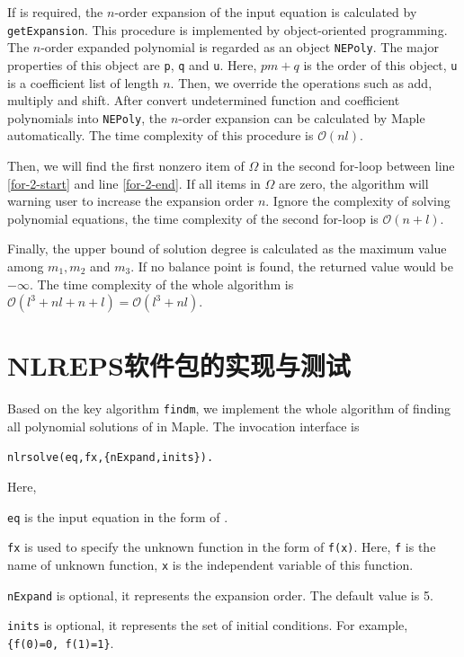 If \BPthree{} is required, the $n$-order expansion of the input equation is calculated by \texttt{getExpansion}. This procedure is implemented by object-oriented programming. The $n$-order expanded polynomial is regarded as an object \texttt{NEPoly}. The major properties of this object are \texttt{p}, \texttt{q} and \texttt{u}. Here, $pm+q$ is the order of this object, \texttt{u} is a coefficient list of length $n$. Then, we override the operations such as add, multiply and shift. After convert undetermined function and coefficient polynomials into \texttt{NEPoly}, the $n$-order expansion can be calculated by Maple automatically. The time complexity of this procedure is $\mathcal O(nl)$.

Then, we will find the first nonzero item of $\Omega$ in the second for-loop between line \ref{for-2-start} and line \ref{for-2-end}. If all items in $\Omega$ are zero, the algorithm will warning user to increase the expansion order $n$. Ignore the complexity of solving polynomial equations, the time complexity of the second for-loop is $\mathcal O(n+l)$.

Finally, the upper bound of solution degree is calculated as the maximum value among $m_1,m_2$ and $m_3$. If no balance point is found, the returned value would be $-\infty$. The time complexity of the whole algorithm is $\mathcal O(l^3+nl+n+l)=\mathcal O(l^3+nl)$.

\section{NLREPS软件包的实现与测试}

Based on the key algorithm \texttt{findm}, we implement the whole algorithm of finding all polynomial solutions of  in Maple. The invocation interface is
\begin{verbatim}
nlrsolve(eq,fx,{nExpand,inits}).
\end{verbatim}
Here,
\begin{compactitem}[\textbullet]
\item \texttt{eq} is the input equation in the form of .
\item \texttt{fx} is used to specify the unknown function in the form of \texttt{f(x)}. Here, \texttt{f} is the name of unknown function, \texttt{x} is the independent variable of this function.
\item \texttt{nExpand} is optional, it represents the expansion order. The default value is 5.
\item \texttt{inits} is optional, it represents the set of initial conditions. For example, \texttt{\{f(0)=0, f(1)=1\}}.
\end{compactitem}

